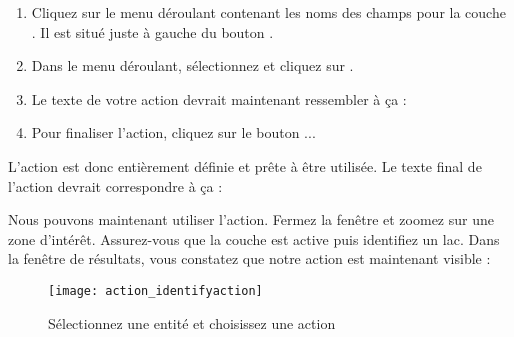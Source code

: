 \begin{enumerate}
\item Cliquez sur le menu déroulant contenant les noms des champs pour la couche . Il est situé juste à gauche du bouton .
\item Dans le menu déroulant, sélectionnez  et cliquez sur .
\item Le texte de votre action devrait maintenant ressembler à ça :\\
\item Pour finaliser l'action, cliquez sur le bouton ...
\end{enumerate}

L'action est donc entièrement définie et prête à être utilisée. Le texte final de l'action devrait correspondre à ça :

\begin{center}
\end{center}

Nous pouvons maintenant utiliser l'action. Fermez la fenêtre  et zoomez sur une zone d'intérêt. Assurez-vous que la couche  est active puis identifiez un lac. Dans la fenêtre de résultats, vous constatez que notre action est maintenant visible :

\begin{figure}[H]
  \begin{center}
  \caption{Sélectionnez une entité et choisissez une action \nixcaption}\label{fig:identify_action}\smallskip
  \texttt{[image: action\_identifyaction]}
\end{center}
\end{figure}

